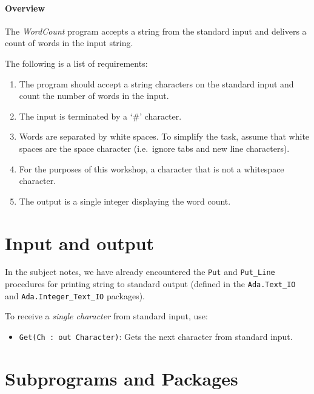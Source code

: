 \documentclass{article}
\begin{document}
\paragraph{Overview}  The \emph{WordCount} program accepts a string from the standard input and delivers a count of words in the input string.  

The following is a list of requirements:

\begin{enumerate}

  \item The program should accept a string characters on the standard
    input and count the number of words in the input.

  \item The input is terminated by a `\#' character.

  \item Words are separated by white spaces. To simplify the task, assume that white spaces are the space character (i.e.\ ignore tabs and new line characters).

  \item For the purposes of this workshop, a character that is not a whitespace character.
    
  \item The output is a single integer displaying the word count.

\end{enumerate}

\section*{Input and output}

In the subject notes, we have already encountered the \texttt{Put} and \texttt{Put\_Line} procedures for printing string to standard output (defined in the \texttt{Ada.Text\_IO} and \texttt{Ada.Integer\_Text\_IO} packages).

To receive a \emph{single character} from standard input, use:

\begin{itemize}
 \item \texttt{Get(Ch : out Character)}: Gets the next character from standard input.
\end{itemize}

\section*{Subprograms and Packages}
\label{section:packages}
\end{document}
